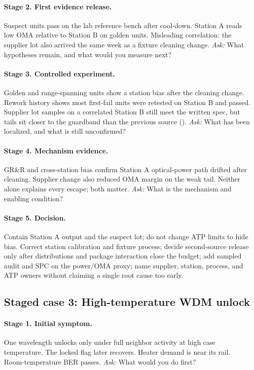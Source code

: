\paragraph{Stage 2. First evidence release.}
Suspect units pass on the lab reference bench after cool-down. Station A reads
low OMA relative to Station B on golden units. Misleading correlation: the
supplier lot also arrived the same week as a fixture cleaning change.
\textit{Ask:} What hypotheses remain, and what would you measure next?

\paragraph{Stage 3. Controlled experiment.}
Golden and range-spanning units show a station bias after the cleaning change.
Rework history shows most first-fail units were retested on Station B and
passed. Supplier lot samples on a correlated Station B still meet the written
spec, but tails sit closer to the guardband than the previous source
().
\textit{Ask:} What has been localized, and what is still unconfirmed?

\paragraph{Stage 4. Mechanism evidence.}
GR\&R and cross-station bias confirm Station A optical-power path drifted after
cleaning. Supplier change also reduced OMA margin on the weak tail. Neither
alone explains every escape; both matter.
\textit{Ask:} What is the mechanism and enabling condition?

\paragraph{Stage 5. Decision.}
Contain Station A output and the suspect lot; do not change ATP limits to hide
bias. Correct station calibration and fixture process; decide second-source
release only after distributions and package interaction close the budget;
add sampled audit and SPC on the power/OMA proxy; name supplier, station,
process, and ATP owners without claiming a single root cause too early.

\subsection{Staged case 3: High-temperature WDM unlock}
\label{sec:case-staged-wdm-unlock}

\paragraph{Stage 1. Initial symptom.}
One wavelength unlocks only under full neighbor activity at high case
temperature. The locked flag later recovers. Heater demand is near its rail.
Room-temperature BER passes.
\textit{Ask:} What would you do first?

